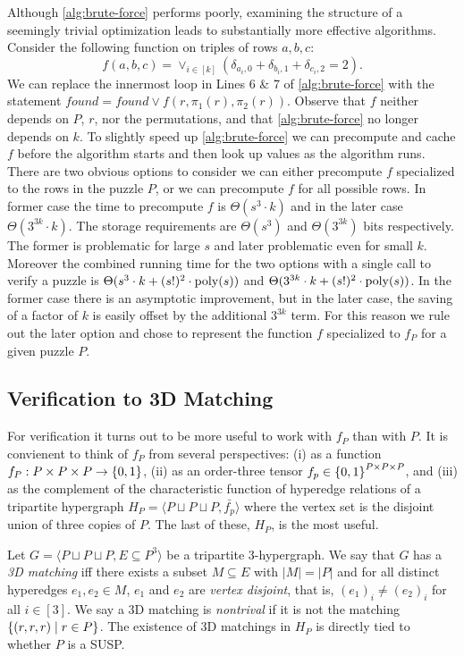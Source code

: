 \documentclass[11pt]{article}
\newcommand\sse{\subseteq}
\newcommand\condset[2]{\set{#1 \;|\; #2}}
\begin{document}
Although \autoref{alg:brute-force} performs poorly, examining the
structure of a seemingly trivial optimization leads to substantially
more effective algorithms. Consider the following function on triples of rows $a, b,
c$: $$f(a,b,c) = \vee_{i \in [k]} (\delta_{a_i,0} + \delta_{b_i,1} +
\delta_{c_i,2} = 2).$$ We can replace the innermost loop in Lines 6 \&
7 of \autoref{alg:brute-force} with the statement $found = found \vee
f(r, \pi_1(r), \pi_2(r))$.  Observe that $f$ neither depends on $P$,
$r$, nor the permutations, and that \autoref{alg:brute-force} no
longer depends on $k$.  To slightly speed up \autoref{alg:brute-force}
we can precompute and cache $f$ before the algorithm starts and then
look up values as the algorithm runs.  There are two obvious options
to consider we can either precompute $f$ specialized to the rows in
the puzzle $P$, or we can precompute $f$ for all possible rows.  In
former case the time to precompute $f$ is $\Theta(s^3 \cdot k)$ and in
the later case $\Theta(3^{3k} \cdot k)$.  The storage requirements are
$\Theta(s^3)$ and $\Theta(3^{3k})$ bits respectively.  The former is
problematic for large $s$ and later problematic even for small $k$.
Moreover the combined running time for the two options with a single
call to verify a puzzle is $\Theta(s^3 \cdot k + (s!)^2 \cdot
\operatorname{poly}(s))$ and $\Theta(3^{3k} \cdot k + (s!)^2 \cdot \operatorname{poly}(s))$.  In
the former case there is an asymptotic improvement, but in the later
case, the saving of a factor of $k$ is easily offset by the additional
$3^{3k}$ term.  For this reason we rule out the later option and chose
to represent the function $f$ specialized to $f_P$ for a given puzzle
$P$.

\subsection{Verification to 3D Matching}

For verification it turns out to be more useful to work with $f_P$
than with $P$.  It is convienent to think of $f_P$ from several
perspectives: (i) as a function $f_P : P \times P \times P \rightarrow
\left\{ 0, 1 \right\}$, (ii) as an order-three tensor $f_p \in \left\{ 0,1 \right\}^{P
  \times P \times P}$, and (iii) as the complement of the
characteristic function of hyperedge relations of a tripartite
hypergraph $H_P = \langle P \sqcup P \sqcup P, \bar{f_p}\rangle$ where
the vertex set is the disjoint union of three copies of $P$.  The last
of these, $H_P$, is the most useful.

Let $G = \langle P \sqcup P \sqcup P, E \sse P^3\rangle$ be a
tripartite 3-hypergraph.  We say that $G$ has a \emph{3D matching} iff
there exists a subset $M \sse E$ with $|M| = |P|$ and for all distinct
hyperedges $e_1, e_2 \in M$, $e_1$ and $e_2$ are \emph{vertex
  disjoint}, that is, $(e_1)_i \neq (e_2)_i$ for all $i \in [3]$.  We
say a 3D matching is \emph{nontrival} if it is not the matching
$\condset{(r,r,r)}{r \in P}$.  The existence of 3D matchings in $H_P$
is directly tied to whether $P$ is a SUSP.
\end{document}
